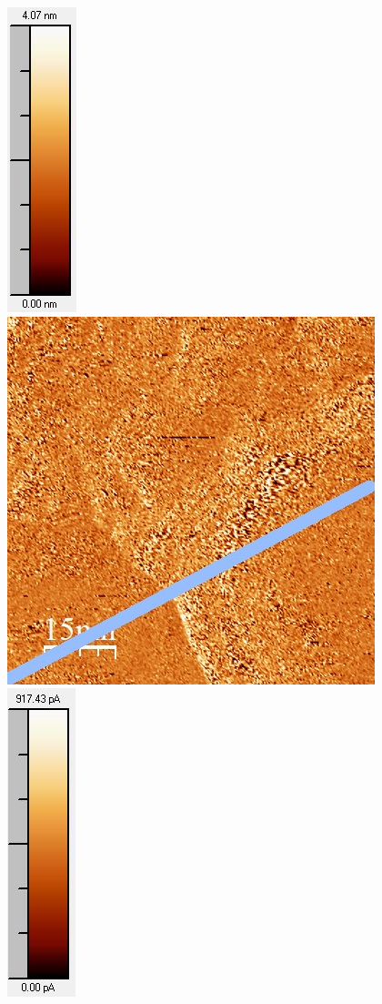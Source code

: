 \documentclass[12pt,a4paper]{article}
\begin{document}
\begin{figure}[H]
\includegraphics[scale=0.6]{Bilder/Anhang/Zeit/0_4_Zeit_nach_Skala.jpg}
\includegraphics[scale=0.6]{Bilder/Anhang/Zeit/Strom/0_4_Zeit_vor_Strom.jpg}
\includegraphics[scale=0.6]{Bilder/Anhang/Zeit/Strom/0_4_Zeit_vor_Strom_Skala.jpg}

\end{figure}
\end{document}
